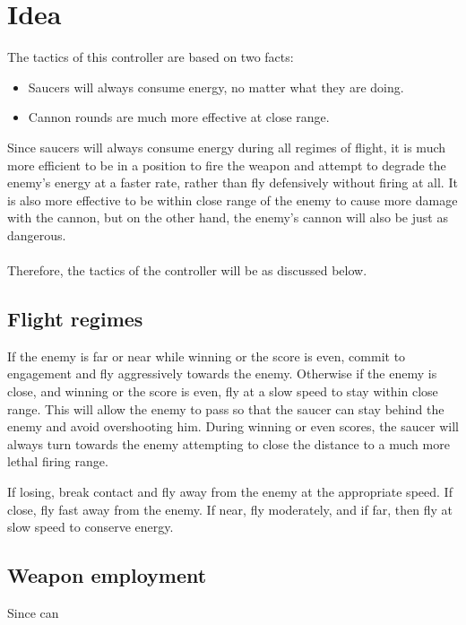 \newpage

\section{Idea}

The tactics of this controller are based on two facts:

\begin{itemize}
	\item Saucers will always consume energy, no matter what they are doing.
	\item Cannon rounds are much more effective at close range.
\end{itemize}

Since saucers will always consume energy during all regimes of flight, it is much more efficient to be in a position to fire the weapon and attempt to degrade the enemy's energy at a faster rate, rather than fly defensively without firing at all. It is also more effective to be within close range of the enemy to cause more damage with the cannon, but on the other hand, the enemy's cannon will also be just as dangerous.\\
\\
Therefore, the tactics of the controller will be as discussed below.

\subsection{Flight regimes}

If the enemy is far or near while winning or the score is even, commit to engagement and fly aggressively towards the enemy. Otherwise if the enemy is close, and winning or the score is even, fly at a slow speed to stay within close range. This will allow the enemy to pass so that the saucer can stay behind the enemy and avoid overshooting him. During winning or even scores, the saucer will always turn towards the enemy attempting to close the distance to a much more lethal firing range.

If losing, break contact and fly away from the enemy at the appropriate speed. If close, fly fast away from the enemy. If near, fly moderately, and if far, then fly at slow speed to conserve energy.

\subsection{Weapon employment}

Since can